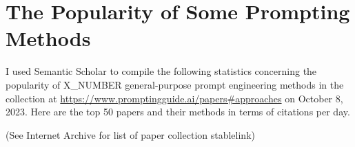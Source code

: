 \documentclass[11pt]{article}
\begin{document}



\appendix

\section{The Popularity of Some Prompting Methods}

I used Semantic Scholar \cite{noauthor_semantic_nodate} to compile the following statistics concerning the popularity of X_NUMBER general-purpose prompt engineering methods in the collection at \url{https://www.promptingguide.ai/papers#approaches} on October 8, 2023. Here are the top 50 papers and their methods in terms of citations per day.

(See Internet Archive for list of paper collection stablelink)
\end{document}

